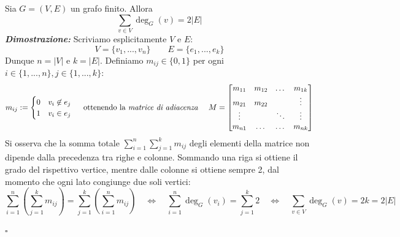 \documentclass[oneside]{book}
\theoremstyle{remark}
\newcommand{\cvd}{\begin{flushright}$\square$\end{flushright}} %
\begin{document}
\begin{tcolorbox}[title={Relazione fondamentale dei grafi finiti}]
Sia $G=(V,E)$ un grafo finito. Allora
\[ \sum_{v\in V} \deg_G(v) = 2|E| \]
\textit{\textbf{Dimostrazione:}} Scriviamo esplicitamente $V$ e $E$:
\[ V=\{v_1,...,v_n\} \qquad E=\{e_1,...,e_k\} \]
Dunque $n=|V|$ e $k=|E|$. Definiamo $m_{ij} \in \{0,1\}$ per ogni
$i \in \{1,...,n\}, j \in \{1,...,k\}$:
\[ m_{ij} :=
    \begin{cases}
        0 & v_i \not \in e_j\\
        1 & v_i \in e_j
    \end{cases}
    \quad \text{ ottenendo la \textit{matrice di adiacenza} } \quad
    M =
    \begin{bmatrix}
        m_{11} & m_{12} & \dots  & m_{1k}\\
        m_{21} & m_{22} &        & \vdots\\
        \vdots &        & \ddots & \vdots\\
        m_{n1} & \dots  & \dots  & m_{nk}\\
    \end{bmatrix}
\]
Si osserva che la somma totale $\sum_{i=1}^{n}\sum_{j=1}^{k}m_{ij}$ degli elementi
della matrice non dipende dalla precedenza tra righe e colonne. Sommando
una riga si ottiene il grado del rispettivo vertice, mentre dalle
colonne si ottiene sempre 2, dal momento che ogni lato congiunge due
soli vertici:
\[ \sum_{i=1}^{n}\left(\sum_{j=1}^{k}m_{ij}\right) = \sum_{j=1}^{k}\left(\sum_{i=1}^{n}m_{ij}\right)
\quad\Longleftrightarrow\quad \sum_{i=1}^{n}\deg_G(v_i) = \sum_{j=1}^{k}2
\quad\Longleftrightarrow\quad \sum_{v\in V}\deg_G(v)=2k=2|E| \]
\cvd
\end{tcolorbox}
\end{document}
